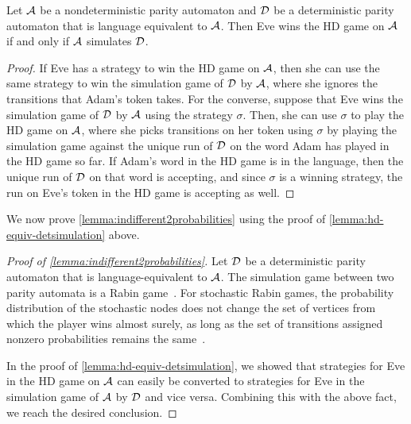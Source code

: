 \begin{lemma}\label{lemma:hd-equiv-detsimulation}
     Let $\mathcal{A}$ be a nondeterministic parity automaton and $\mathcal{D}$ be a deterministic parity automaton that is language equivalent to $\mathcal{A}$. Then Eve wins the HD game on $\mathcal{A}$ if and only if $\mathcal{A}$ simulates $\mathcal{D}$.
\end{lemma}
\begin{proof}
    If Eve has a strategy to win the HD game on $\mathcal{A}$, then she can use the same strategy to win the simulation game of $\mathcal{D}$ by $\mathcal{A}$, where she ignores the transitions that Adam's token takes. For the converse, suppose that Eve wins the simulation game of $\mathcal{D}$ by $\mathcal{A}$ using the strategy $\sigma$. Then, she can use $\sigma$ to play the HD game on $\mathcal{A}$, where she picks transitions on her token using $\sigma$ by playing the simulation game against the unique run of $\mathcal{D}$ on the word Adam has played in the HD game so far. If Adam's word in the HD game is in the language, then the unique run of $\mathcal{D}$ on that word is accepting, and since $\sigma$ is a winning strategy, the run on Eve's token in the HD game is accepting as well.
\end{proof}

We now prove \cref{lemma:indifferent2probabilities} using the proof of \cref{lemma:hd-equiv-detsimulation} above.

\begin{proof}[Proof of \cref{lemma:indifferent2probabilities}]
Let $\mathcal{D}$ be a deterministic parity automaton that is language-equivalent to $\mathcal{A}$. The simulation game between two parity automata is a Rabin game~\cite[Pages 154-155]{CHP07}. For stochastic Rabin games, the probability distribution of the stochastic nodes does not change the set of vertices from which the player wins almost surely, as long as the set of transitions assigned nonzero probabilities remains the same~\cite[Theorem~1]{BNNSS22}. 

In the proof of \cref{lemma:hd-equiv-detsimulation}, we showed that strategies for Eve in the HD game on $\mathcal{A}$ can easily be converted to strategies for Eve in the simulation game of $\mathcal{A}$ by $\mathcal{D}$ and vice versa. Combining this with the above fact, we reach the desired conclusion.
\end{proof}

